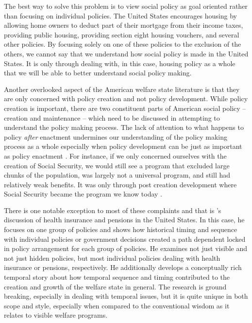 \documentclass[12pt]{article}
\begin{document}
The best way to solve this problem is to view social policy as goal oriented rather than focusing on individual policies. The United States encourages housing by allowing home owners to deduct part of their mortgage from their income taxes, providing public housing, providing section eight housing vouchers, and several other policies. By focusing solely on one of these policies to the exclusion of the others, we cannot say that we understand how social policy is made in the United States. It is only through dealing with, in this case, housing policy as a whole that we will be able to better understand social policy making.

Another overlooked aspect of the American welfare state literature is that they are only concerned with policy creation and not policy development. While policy creation is important, there are two constituent parts of American social policy -- creation and maintenance -- which need to be discussed in attempting to understand the policy making process. The lack of attention to what happens to policy \emph{after} enactment undermines our understanding of the policy making process as a whole especially when policy development can be just as important as policy enactment \citep{patashnik2008}. For instance, if we only concerned ourselves with the creation of Social Security, we would still see a program that excluded large chunks of the population, was largely not a universal program, and still had relatively weak benefits. It was only through post creation development where Social Security became the program we know today \citep{derthick1979}.

There is one notable exception to most of these complaints and that is \citet{hacker2002}'s discussion of health insurance and pensions in the United States. In this case, he focuses on one group of policies and shows how historical timing and sequence with individual policies or government decisions created a path dependent locked in policy arrangement for each group of policies. He examines not just visible and not just hidden policies, but most individual policies dealing with health insurance or pensions, respectively. He additionally develops a conceptually rich temporal story about how temporal sequence and timing contributed to the creation and growth of the welfare state in general. The \cite{hacker2002} research is ground breaking, especially in dealing with temporal issues, but it is quite unique in both scope and style, especially when compared to the conventional wisdom as it relates to visible welfare programs.
\end{document}
